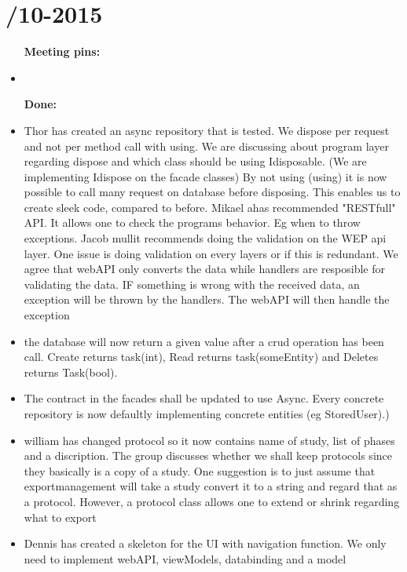 \section{/10-2015} %
\attend{\at}{\at}{\at}{\at}


\begin{itemize}
	\item [\textbf{Meeting pins:}]
	\item 
	\end{itemize}

\begin{itemize}
	\item [\textbf{Done:}]
	\item Thor has created an async repository that is tested. We dispose per request and not per method call with using. We are discussing about program layer regarding dispose and which class should be using Idisposable. (We are implementing Idispose on the facade classes) By not using (using) it is now possible to call many request on database before disposing. This enables us to create sleek code, compared to before. Mikael ahas recommended "RESTfull" API. It allows one to check the programs behavior. Eg when to throw exceptions. Jacob mullit recommends doing the validation on the WEP api layer. One issue is doing validation on every layers or if this is redundant. We agree that webAPI only converts the data while handlers are resposible for validating the data. IF something is wrong with the received data, an exception will be thrown by the handlers. The webAPI will then handle the exception
	\item the database will now return a given value after a crud operation has been call. Create returns task(int), Read returns task(someEntity) and Deletes returns Task(bool).
	\item The contract in the facades shall be updated to use Async. Every concrete repository is now defaultly implementing concrete entities (eg StoredUser).)
	\item william has changed protocol so it now contains name of study, list of phases and a discription. The group discusses whether we shall keep protocols since they basically  is a copy of a study. One suggestion is to just assume that exportmanagement will take a study convert it to a string and regard that as a protocol. However, a protocol class allows one to extend or shrink regarding what to export
	\item Dennis has created a skeleton for the UI with navigation function. We only need to implement webAPI, viewModels, databinding and a model

\end{itemize}
